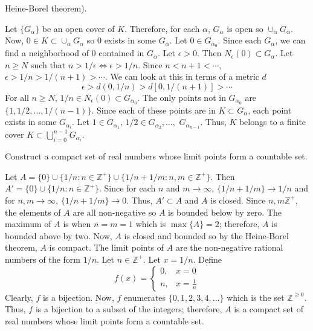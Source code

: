 \begin{exercise}
  Heine-Borel theorem).
  \par\smallskip
  Let \(\{G_{\alpha}\}\) be an open cover of \(K\).
  Therefore, for each \(\alpha\), \(G_{\alpha}\) is open so
  \(\cup_{\alpha}G_{\alpha}\).
  Now, \(0\in K\subset\cup_{\alpha}G_{\alpha}\) so \(0\) exists in some
  \(G_{\alpha}\).
  Let \(0\in G_{\alpha_0}\).
  Since each \(G_{\alpha}\), we can find a neighborhood of \(0\) contained in
  \(G_{\alpha}\).
  Let \(\epsilon > 0\).
  Then \(N_{\epsilon}(0)\subset G_{\alpha}\).
  Let \(n\geq N\) such that \(n > 1/\epsilon\iff\epsilon > 1/n\).
  Since \(n < n + 1 < \cdots\), \(\epsilon > 1/n > 1/(n + 1) > \cdots\).
  We can look at this in terms of a metric \(d\)
  \[
  \epsilon > d(0, 1/n) > d[0, 1/(n + 1)] > \cdots
  \]
  For all \(n\geq N\), \(1/n\in N_{\epsilon}(0)\subset G_{\alpha_0}\).
  The only points not in \(G_{\alpha_0}\) are \(\{1,1/2,\ldots,1/(n - 1)\}\).
  Since each of these points are in \(K\subset G_{\alpha}\), each point exists
  in some \(G_{\alpha_i}\).
  Let \(1\in G_{\alpha_1}\), \(1/2\in G_{\alpha_2},\ldots,\)
  \(G_{\alpha_{n - 1}}\).
  Thus, \(K\) belongs to a finite cover
  \(K\subset\bigcup_{i = 0}^{n - 1}G_{\alpha_i}\).
\item
  Construct a compact set of real numbers whose limit points form a countable
  set.
  \par\smallskip
  Let \(A = \{0\}\cup\{1/n\colon n\in\mathbb{Z}^+\}\cup
  \{1/n + 1/m\colon n,m\in\mathbb{Z}^+\}\).
  Then \(A' = \{0\}\cup\{1/n\colon n\in\mathbb{Z}^+\}\).
  Since for each \(n\) and \(m\to\infty\), \(\{1/n + 1/m\}\to 1/n\) and
  for \(n,m\to\infty\), \(\{1/n + 1/m\}\to 0\).
  Thus, \(A'\subset A\) and \(A\) is closed.
  Since \(n,m\mathbb{Z}^+\), the elements of \(A\) are all non-negative so
  \(A\) is bounded below by zero.
  The maximum of \(A\) is when \(n = m = 1\) which is \(\max\{A\} = 2\);
  therefore, \(A\) is bounded above by two.
  Now, \(A\) is closed and bounded so by the Heine-Borel theorem, \(A\) is
  compact.
  The limit points of \(A\) are the non-negative rational numbers of the form
  \(1/n\).
  Let \(n\in\mathbb{Z}^+\).
  Let \(x = 1/n\).
  Define
  \[
  f(x) =
  \begin{cases}
    0, & x = 0\\
    n, & x = \frac{1}{n}
  \end{cases}
  \]
  Clearly, \(f\) is a bijection.
  Now, \(f\) enumerates \(\{0,1,2,3,4,\ldots\}\) which is the set
  \(\mathbb{Z}^{\geq 0}\).
  Thus, \(f\) is a bijection to a subset of the integers; therefore, \(A\) is
  a compact set of real numbers whose limit points form a countable set.

\end{exercise}
